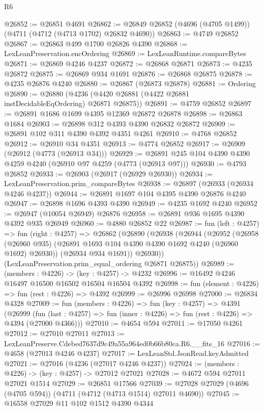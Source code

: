 \begin{lexlean}{R6}
\begin{coremodule}
@26852 := @26851 @4691
@26862 := @26849 @26852 (@4696 (@4705 @1499)) (@4711 (@4712 (@4713 @1702) @26832 @4690))
@26863 := @4749 @26852
@26867 := @26863 @499 @1700 @26826 @4390
@26868 := LexLeanPreservation.encOrdering
@26869 := LexLeanRuntime.compareBytes
@26871 := @26869 @4246 @4237
@26872 := @26868 @26871
@26873 := @4235 @26872
@26875 := @26869 @934 @1691
@26876 := @26868 @26875
@26878 := @4235 @26876 @4240
@26880 := @26867 (@26873 @26878)
@26881 := Ordering
@26890 := @26880 (@4236 (@4420 @26881 (@4422 @26881 instDecidableEqOrdering) @26871 @26875))
@26891 := @4759 @26852
@26897 := @26891 @1686 @1699 @4395 @12369 @26872 @26878
@26898 := @26863 @1684
@26903 := @26898 @312 @4393 @4390 @26832 @26872
@26909 := @26891 @102 @311 @4390 @4392 @4351 @4261
@26910 := @4768 @26852
@26912 := @26910 @34 @4351
@26913 := @4774 @26852
@26917 := @26909 (@26912 (@4773 (@26913 @34)))
@26929 := @26891 @245 @104 @4390 @4390 @4259 @4240 (@26910 @97 @4259 (@4773 (@26913 @97)))
@26930 := @4793 @26852
@26933 := @26903 (@26917 (@26929 @26930))
@26934 := LexLeanPreservation.prim_compareBytes
@26938 := @26897 (@26933 (@26934 @4246 @4237))
@26944 := @26891 @1697 @104 @4395 @4390 @26876 @4240
@26947 := @26898 @1696 @4393 @4390
@26949 := @4235 @1692 @4240
@26952 := @26947 (@10054 @26949) @26876
@26958 := @26891 @936 @1695 @4390 @4392 @935 @26949
@26960 := @4880 @26852 @22
@26987 := fun (left : @4257) =>
  fun (right : @4257) =>
  @26862
    (@26890
      (@26938
        (@26944
          (@26952
            (@26958 (@26960 @935) (@26891 @1693 @104 @4390 @4390 @1692 @4240 (@26960 @1692) @26930))
            (@26934 @934 @1691))
          @26930))
      (LexLeanPreservation.prim_equal_ordering @26871 @26875))
@26989 := (members : @4226) -> (key : @4257) -> @4232
@26996 := @16492 @4246 @16497 @16500 @16502 @16504 @16504 @4392
@26998 := fun (element : @4226) => fun (rest : @4226) => @4392
@26999 := @26996 @26998
@27000 := @26834 @4328
@27009 := fun (members : @4226) =>
  fun (key : @4257) =>
  @4391
    (@26999
      (fun (last : @4257) => fun (inner : @4226) => fun (rest : @4226) => @4394 (@27000 @4366)))
@27010 := @4654 @594
@27011 := @17050 @4261
@27012 := @27010 @27011
@27013 := LexLeanPreserve.Cdebed7637d9c49a55a964ed0b66b80ca.R6.__fits_16
@27016 := @4658 (@27013 @4246 @4237)
@27017 := LexLeanStd.JsonRead.keyAdmitted
@27021 := @27016 (@4236 (@27017 @4246 @4237))
@27024 := (members : @4226) -> (key : @4257) -> @27012 @27021
@27028 := @4672 @594 @27011 @27021 @1514
@27029 := @26851 @17566
@27039 := @27028 @27029 (@4696 (@4705 @594)) (@4711 (@4712 (@4713 @1514) @27011 @4690))
@27045 := @16558 @27029 @11 @102 @1512 @4390 @4344

\end{coremodule}
\end{lexlean}

